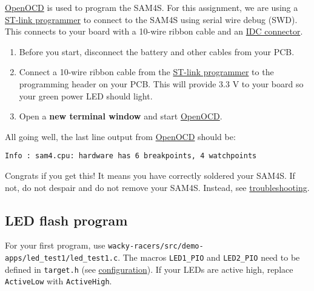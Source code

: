 \url{OpenOCD} is used to program the SAM4S. For this assignment, we are
using a \href{ST-link_programmer}{ST-link programmer} to connect to the
SAM4S using serial wire debug (SWD). This connects to your board with a
10-wire ribbon cable and an \href{IDC_connector}{IDC connector}.

\begin{enumerate}
\item
  Before you start, disconnect the battery and other cables from your
  PCB.
\item
  Connect a 10-wire ribbon cable from the
  \href{ST-link_programmer}{ST-link programmer} to the programming
  header on your PCB. This will provide 3.3 V to your board so your
  green power LED should light.
\item
  Open a \textbf{new terminal window} and start \url{OpenOCD}.
\end{enumerate}

\begin{Shaded}
\begin{Highlighting}[]
\NormalTok{$ }
\NormalTok{$ }
\end{Highlighting}
\end{Shaded}

All going well, the last line output from \url{OpenOCD} should be:

\begin{verbatim}
Info : sam4.cpu: hardware has 6 breakpoints, 4 watchpoints
\end{verbatim}

Congrats if you get this! It means you have correctly soldered your
SAM4S. If not, do not despair and do not remove your SAM4S. Instead,
see \protect\hyperref[troubleshooting]{troubleshooting}.


\subsection{LED flash program}
\label{led-flash-program}

For your first program, use
\texttt{wacky-racers/src/demo-apps/led\_test1/led\_test1.c}. The macros
\texttt{LED1\_PIO} and \texttt{LED2\_PIO} need to be defined in
\texttt{target.h} (see
\protect\hyperref[configuration]{configuration}). If your LEDs are
active high, replace \texttt{ActiveLow} with \texttt{ActiveHigh}.

